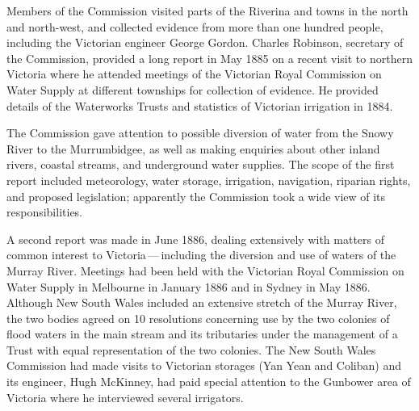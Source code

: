 Members of the Commission visited parts of the Riverina and towns in
the north and north-west, and collected evidence from more than one
hundred people, including the Victorian engineer George
Gordon.   Charles Robinson, 
secretary of the Commission, provided a long report in May 1885 on a
recent visit to northern Victoria where he attended meetings of the
Victorian Royal Commission on Water Supply at different townships for
collection of evidence. He provided details of the Waterworks Trusts
and statistics of Victorian irrigation in 1884.

The Commission gave attention to possible diversion of water from the
Snowy River  to the Murrumbidgee,
 as well as making
enquiries about other inland rivers, coastal streams, and underground
water supplies.  The scope of the first report included meteorology,
water storage, irrigation, navigation, riparian rights, and proposed
legislation; apparently the Commission took a wide view of its
responsibilities.

A second report was made in June 1886, dealing extensively with
matters of common interest to Victoria\,---\,including the diversion
and use of waters of the Murray River.   Meetings
had been held with the Victorian Royal Commission on Water Supply in
Melbourne in January 1886 and in Sydney in May 1886.  Although New
South Wales included an extensive stretch of the Murray River, the two
bodies agreed on 10 resolutions concerning use by the two colonies of
flood waters in the main stream and its tributaries under the
management of a Trust with equal representation of the two colonies.
The New South Wales Commission had made visits to Victorian storages
(Yan Yean and Coliban) 
 and its engineer, Hugh McKinney,
 had paid special attention to the Gunbower area 
of Victoria where he interviewed several irrigators.

